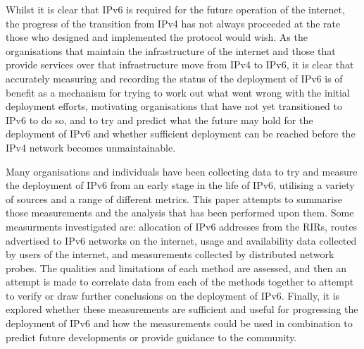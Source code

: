 Whilst it is clear that IPv6 is required for the future operation of the
internet\cite{huston_ipv6_2008}, the progress of the transition from IPv4  has not always proceeded
at the rate those who designed and implemented the protocol would wish. As the
organisations that maintain the infrastructure of the internet and those that
provide services over that infrastructure move from IPv4 to IPv6, it is clear
that accurately measuring and recording the status of the deployment of IPv6
is of benefit as a mechanism for trying to work out what went wrong with
the initial deployment efforts, motivating organisations that have not yet
transitioned to IPv6 to do so, and to try and predict what the future may hold
for the deployment of IPv6 and whether sufficient deployment can be reached before
the IPv4 network becomes unmaintainable\cite{huston_primer_2013}.

Many organisations and individuals have been collecting data to try and measure
the deployment of IPv6 from an
early stage in the life of IPv6, utilising a variety of sources and a range of
different metrics. This paper attempts to summarise those measurements and
the analysis that has been performed upon them. Some measurments investigated
are: allocation of IPv6 addresses from the RIRs, routes advertised to IPv6
networks on the internet,  
usage and availability data collected by users of the internet, and measurements
collected by distributed network probes.
The qualities and limitations of each method are assessed, and then an attempt
is made to correlate data from each of the methods together to attempt to verify
or draw further conclusions on the deployment of IPv6. 
Finally, it is explored whether these
measurements are sufficient and useful for progressing
the deployment of IPv6 and how the measurements could be used in combination to
predict future developments or provide guidance to the community.

